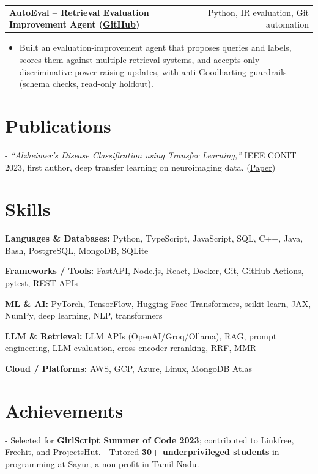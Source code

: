 \documentclass[letterpaper,11pt]{article}
\makeatletter
\newcommand{\projItem}[2]{%
  \vspace{6pt}
  \begin{tabular*}{\textwidth}{@{}l@{\extracolsep{\fill}}r@{}}
    \textbf{#1} & #2 \\
  \end{tabular*}\par\vspace{-2pt}
}
\newcommand{\skillLine}[2]{\textbf{#1:} #2\par\vspace{2pt}}
\newcommand{\inlineBlock}[1]{{\setlength{\leftskip}{0.18in}\small #1\par}}
\makeatother
\begin{document}
\projItem{AutoEval -- Retrieval Evaluation Improvement Agent {\normalfont\small(\href{https://github.com/Deva-1903/AutoEval}{GitHub})}}{Python, IR evaluation, Git automation}
\begin{itemize}
  \item Built an evaluation-improvement agent that proposes queries and labels, scores them against multiple retrieval systems, and accepts only discriminative-power-raising updates, with anti-Goodharting guardrails (schema checks, read-only holdout).
\end{itemize}

\section{Publications}
\inlineBlock{- \textit{``Alzheimer's Disease Classification using Transfer Learning,''} IEEE CONIT 2023, first author, deep transfer learning on neuroimaging data. {\normalfont\small(\href{https://ieeexplore.ieee.org/document/10205760}{Paper})}}

\section{Skills}
\skillLine{Languages \& Databases}{Python, TypeScript, JavaScript, SQL, C++, Java, Bash, PostgreSQL, MongoDB, SQLite}
\skillLine{Frameworks / Tools}{FastAPI, Node.js, React, Docker, Git, GitHub Actions, pytest, REST APIs}
\skillLine{ML \& AI}{PyTorch, TensorFlow, Hugging Face Transformers, scikit-learn, JAX, NumPy, deep learning, NLP, transformers}
\skillLine{LLM \& Retrieval}{LLM APIs (OpenAI/Groq/Ollama), RAG, prompt engineering, LLM evaluation, cross-encoder reranking, RRF, MMR}
\skillLine{Cloud / Platforms}{AWS, GCP, Azure, Linux, MongoDB Atlas}

\section{Achievements}
\inlineBlock{- Selected for \textbf{GirlScript Summer of Code 2023}; contributed to Linkfree, Freehit, and ProjectsHut. - Tutored \textbf{30+ underprivileged students} in programming at Sayur, a non-profit in Tamil Nadu.}
\end{document}
